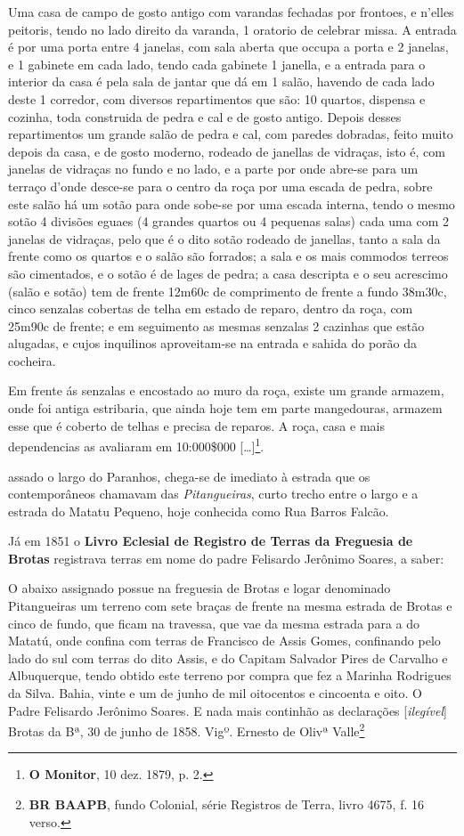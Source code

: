 \begin{citacao}
Uma casa de campo de gosto antigo com varandas fechadas por frontoes, e n'elles peitoris, tendo no lado direito da varanda, 1 oratorio de celebrar missa. A entrada é por uma porta entre 4 janelas, com sala aberta que occupa a porta e 2 janelas, e 1 gabinete em cada lado, tendo cada gabinete 1 janella, e a entrada para o interior da casa é pela sala de jantar que dá em 1 salão, havendo de cada lado deste 1 corredor, com diversos repartimentos que são: 10 quartos, dispensa e cozinha, toda construida de pedra e cal e de gosto antigo. Depois desses repartimentos um grande salão de pedra e cal, com paredes dobradas, feito muito depois da casa, e de gosto moderno, rodeado de janellas de vidraças, isto é, com janelas de vidraças no fundo e no lado, e a parte por onde abre-se para um terraço d'onde desce-se para o centro da roça por uma escada de pedra, sobre este salão há um sotão para onde sobe-se por uma escada interna, tendo o mesmo sotão 4 divisões eguaes (4 grandes quartos ou 4 pequenas salas) cada uma com 2 janelas de vidraças, pelo que é o dito sotão rodeado de janellas, tanto a sala da frente como os quartos e o salão são forrados; a sala e os mais commodos terreos são cimentados, e o sotão é de lages de pedra; a casa descripta e o seu acrescimo (salão e sotão) tem de frente 12m60c de comprimento de frente a fundo 38m30c, cinco senzalas cobertas de telha em estado de reparo, dentro da roça, com 25m90c de frente; e em seguimento as mesmas senzalas 2 cazinhas que estão alugadas, e cujos inquilinos aproveitam-se na entrada e sahida do porão da cocheira.

Em frente ás senzalas e encostado ao muro da roça, existe um grande armazem, onde foi antiga estribaria, que ainda hoje tem em parte mangedouras, armazem esse que é coberto de telhas e precisa de reparos. A roça, casa e mais dependencias as avaliaram em 10:000\$000 [\dots]\footnote{\textbf{O Monitor}, 10 dez. 1879, p. 2.}.
\end{citacao}
assado o largo do Paranhos, chega-se de imediato à estrada que os contemporâneos chamavam das \textit{Pitangueiras}, curto trecho entre o largo e a estrada do Matatu Pequeno, hoje conhecida como Rua Barros Falcão. 

Já em 1851 o \textbf{Livro Eclesial de Registro de Terras da Freguesia de Brotas} registrava terras em nome do padre Felisardo Jerônimo Soares, a saber:

\begin{citacao}
O abaixo assignado possue na freguesia de Brotas e logar denominado Pitangueiras um terreno com sete braças de frente na mesma estrada de Brotas e cinco de fundo, que ficam na travessa, que vae da mesma estrada para a do Matatú, onde confina com terras de Francisco de Assis Gomes, confinando pelo lado do sul com terras do dito Assis, e do Capitam Salvador Pires de Carvalho e Albuquerque, tendo obtido este terreno por compra que fez a Marinha Rodrigues da Silva. Bahia, vinte e um de junho de mil oitocentos e cincoenta e oito. O Padre Felisardo Jerônimo Soares. E nada mais continhão as declarações [\textit{ilegível}] Brotas da Bª, 30 de junho de 1858. 
Vigº. Ernesto de Olivª Valle\footnote{\textbf{BR BAAPB}, fundo Colonial, série Registros de Terra, livro 4675, f. 16 verso.}
\end{citacao}

